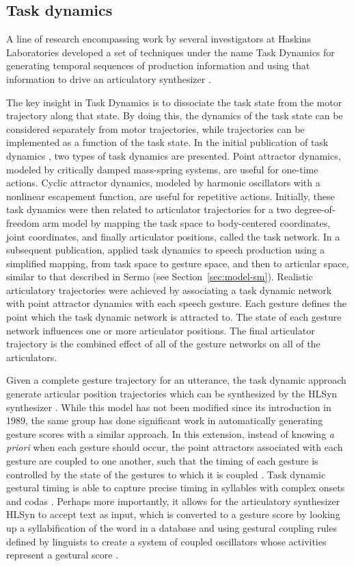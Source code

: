 \subsection{Task dynamics}

A line of research encompassing work by
several investigators at Haskins Laboratories
developed a set of techniques
under the name Task Dynamics
for generating temporal sequences
of production information
and using that information to drive
an articulatory synthesizer \cite{nam2004}.

The key insight in Task Dynamics
is to dissociate the task state
from the motor trajectory
along that state.
By doing this, the dynamics of the task state
can be considered separately from motor trajectories,
while trajectories can be implemented
as a function of the task state.
In the initial publication of task dynamics
\cite{saltzman1987},
two types of task dynamics are presented.
Point attractor dynamics,
modeled by critically damped mass-spring systems,
are useful for one-time actions.
Cyclic attractor dynamics,
modeled by harmonic oscillators
with a nonlinear escapement function,
are useful for repetitive actions.
Initially, these task dynamics were then
related to articulator trajectories
for a two degree-of-freedom arm model
by mapping the task space
to body-centered coordinates,
joint coordinates,
and finally articulator positions,
called the task network.
In a subsequent publication,
\cite{saltzman1989}
applied task dynamics to speech production
using a simplified mapping,
from task space
to gesture space,
and then to articular space,
similar to that described in Sermo
(see Section~\ref{sec:model-sm}).
Realistic articulatory trajectories
were achieved
by associating a task dynamic network
with point attractor dynamics
with each speech gesture.
Each gesture defines
the point which the task dynamic network
is attracted to.
The state of each gesture network
influences one or more articulator positions.
The final articulator trajectory
is the combined effect
of all of the gesture networks
on all of the articulators.

Given a complete gesture trajectory
for an utterance,
the task dynamic approach
generate articular position trajectories
which can be synthesized
by the HLSyn synthesizer \cite{hanson1999}.
While this model has not been
modified since its introduction in 1989,
the same group has done significant work
in automatically generating gesture scores
with a similar approach.
In this extension,
instead of knowing \textit{a priori}
when each gesture should occur,
the point attractors associated
with each gesture are coupled
to one another,
such that the timing of each gesture
is controlled by the state
of the gestures to which it is coupled
\cite{saltzman2000}.
Task dynamic gestural timing
is able to capture precise timing
in syllables with complex onsets
and codas \cite{nam2003}.
Perhaps more importantly,
it allows for the articulatory synthesizer
HLSyn to accept text as input,
which is converted to a gesture score
by looking up a syllabification
of the word in a database
and using gestural coupling rules
defined by linguists
to create a system of coupled oscillators
whose activities represent a gestural score
\cite{goldstein2009,nam2004}.

